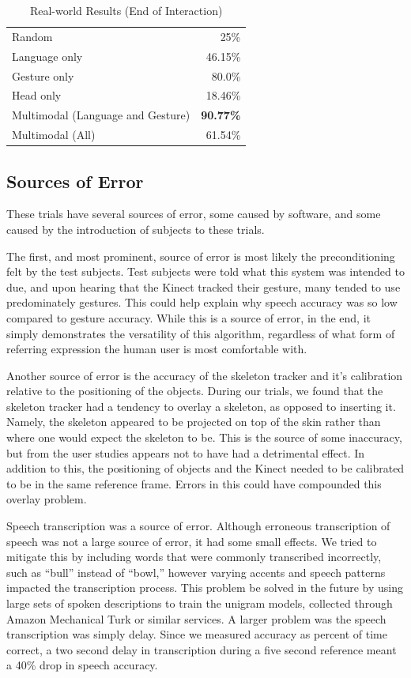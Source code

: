 \documentclass[a4paper, 11pt]{article} %
\begin{document}
\begin{table}
\caption{Real-world Results (End of Interaction)\label{table:end_real}}
\centering
\begin{tabular}{lr}
\toprule
Random & 25\%\\
Language only &  46.15\%\\
Gesture only  &  80.0\%\\
Head only     & 18.46\%\\
Multimodal (Language and Gesture) & {\bf 90.77\%}\\
Multimodal (All) &  61.54\%\\
\bottomrule
\end{tabular}
\end{table}
\subsection{Sources of Error}
These trials have several sources of error, some caused by software, and some caused by the introduction of subjects to these trials.

The first, and most prominent, source of error is most likely the preconditioning felt by the test subjects. Test subjects were told what this system was intended to due, and upon hearing that the Kinect tracked their gesture, many tended to use predominately gestures. This could help explain why speech accuracy was so low compared to gesture accuracy. While this is a source of error, in the end, it simply demonstrates the versatility of this algorithm, regardless of what form of referring expression the human user is most comfortable with.

Another source of error is the accuracy of the skeleton tracker and it's calibration relative to the positioning of the objects. During our trials, we found that the skeleton tracker had a tendency to overlay a skeleton, as opposed to inserting it. Namely, the skeleton appeared to be projected on top of the skin rather than where one would expect the skeleton to be. This is the source of some inaccuracy, but from the user studies appears not to have had a detrimental effect. In addition to this, the positioning of objects and the Kinect needed to be calibrated to be in the same reference frame. Errors in this could have compounded this overlay problem.

Speech transcription was a source of error. Although erroneous transcription of speech was not a large source of error, it had some small effects. We tried to mitigate this by including words that were commonly transcribed incorrectly, such as ``bull'' instead of ``bowl,'' however varying accents and speech patterns impacted the transcription process. This problem  be solved in the future by using large sets of spoken descriptions to train the unigram models, collected through Amazon Mechanical Turk or similar services. A larger problem was the speech transcription was simply delay. Since we measured accuracy as percent of time correct, a two second delay in transcription during a five second reference meant a 40\% drop in speech accuracy.
\end{document}
